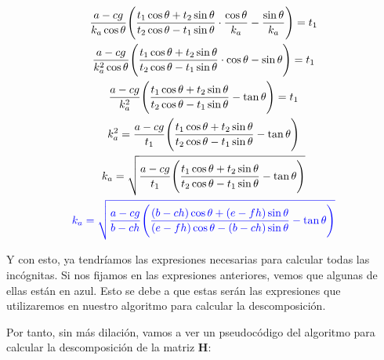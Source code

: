 \documentclass[11pt,a4paper]{article}
\begin{document}
\begin{gather*}
\frac{a-cg}{k_a\cos\theta}\Bigg(\frac{t_1\cos\theta + t_2\sin\theta}{t_2\cos\theta - t_1\sin\theta} \cdot \frac{\cos\theta}{k_a} - \frac{\sin\theta}{k_a}\Bigg) = t_1\\
\frac{a-cg}{k_a^2\cos\theta}\Bigg(\frac{t_1\cos\theta + t_2\sin\theta}{t_2\cos\theta - t_1\sin\theta} \cdot \cos\theta - \sin\theta\Bigg) = t_1\\
\frac{a-cg}{k_a^2}\Bigg(\frac{t_1\cos\theta + t_2\sin\theta}{t_2\cos\theta - t_1\sin\theta} - \tan\theta\Bigg) = t_1\\
k_a^2=\frac{a-cg}{t_1}\Bigg(\frac{t_1\cos\theta + t_2\sin\theta}{t_2\cos\theta - t_1\sin\theta} - \tan\theta\Bigg)\\
k_a=\sqrt{\frac{a-cg}{t_1}\Bigg(\frac{t_1\cos\theta + t_2\sin\theta}{t_2\cos\theta - t_1\sin\theta} - \tan\theta\Bigg)}\\
\textcolor{blue}{k_a=\sqrt{\frac{a-cg}{b-ch}\Bigg(\frac{(b-ch)\cos\theta + (e-fh)\sin\theta}{(e-fh)\cos\theta - (b-ch)\sin\theta} - \tan\theta\Bigg)}}
\end{gather*}

Y con esto, ya tendríamos las expresiones necesarias para calcular
todas las incógnitas. Si nos fijamos en las expresiones anteriores, vemos
que algunas de ellas están en azul. Esto se debe a que estas serán las expresiones
que utilizaremos en nuestro algoritmo para calcular la descomposición.

Por tanto, sin más dilación, vamos a ver un pseudocódigo del algoritmo para
calcular la descomposición de la matriz $\mathbf{H}$:
\end{document}
